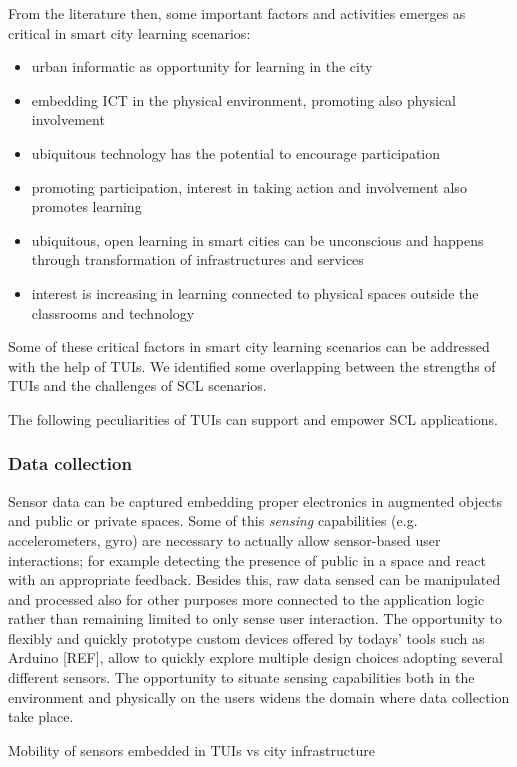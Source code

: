 From the literature then, some important factors and activities emerges as critical in smart city learning scenarios:
\begin{itemize}
\item urban informatic as opportunity for learning in the city
\item embedding ICT in the physical environment, promoting also physical involvement
\item ubiquitous technology has the potential to encourage participation
\item promoting participation, interest in taking action and involvement also promotes learning
\item ubiquitous, open learning in smart cities can be unconscious and happens through transformation of infrastructures and services
\item interest is increasing in learning connected to physical spaces outside the classrooms and technology
\end{itemize}

Some of these critical factors in smart city learning scenarios can be addressed with the help of TUIs. We identified some overlapping between the strengths of TUIs and the challenges of SCL scenarios.

The following peculiarities of TUIs can support and empower SCL applications.

\subsubsection{Data collection}
Sensor data can be captured embedding proper electronics in augmented objects and public or private spaces.
Some of this \textit{sensing} capabilities (e.g. accelerometers, gyro) are necessary to actually allow sensor-based user interactions; for example detecting the presence of public in a space and react with an appropriate feedback. Besides this, raw data sensed can be manipulated and processed also for other purposes more connected to the application logic rather than remaining limited to only sense user interaction.
The opportunity to flexibly and quickly prototype custom devices offered by todays' tools such as Arduino [REF], allow to quickly explore multiple design choices adopting several different sensors.
The opportunity to situate sensing capabilities both in the environment and physically on the users widens the domain where data collection take place.

Mobility of sensors embedded in TUIs vs city infrastructure

